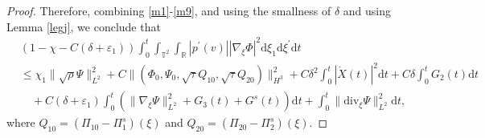 \documentclass[10pt,reqno]{amsart}
\numberwithin{equation}{section}
\newcommand{\dif}{\mathrm{d}}
\newcommand{\ddiv}{\mathrm{div}}
\begin{document}
\begin{proof}
Therefore, combining \eqref{m1}-\eqref{m9}, and using the smallness of $\delta$ and using Lemma \ref{legj}, we conclude that
\begin{equation}\label{hsgj10301}
	\begin{aligned}
		&(1-\chi-C(\delta+\varepsilon_1))\int_0^t\int_{\mathbb{T}^2}\int_{\mathbb{R}}|p^\prime(v)||\nabla_\xi\Phi|^2\dif \xi_1\dif \xi^{\prime}\dif t\\
		&\le
		\chi_1\|\sqrt\rho\Psi\|_{L^2}^2
		+C\|(\Phi_0, \Psi_0,
		\sqrt{\tau}Q_{10}, \sqrt{\tau}Q_{20})\|_{H^3}^2
	+C\delta^2\int_0^t|\dot X(t)|^2\dif t	+C\delta\int_0^t G_2(t)\dif t\\
&\quad		+C(\delta
		+\varepsilon_1)\int_0^t\left(\|\nabla_\xi\Psi\|_{L^2}^2+G_3(t)+G^s(t)\right)\dif t
	+\int_0^t
		\| \ddiv_\xi\Psi\|_{L^2}^2\dif t,
	\end{aligned}
\end{equation}
where $Q_{10}=(\Pi_{10}-\Pi_1^s)(\xi)$ and $Q_{20}=(\Pi_{20}-\Pi_2^s)(\xi)$.



\end{proof}
\end{document}

